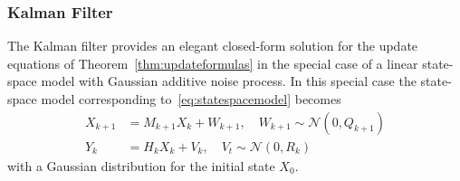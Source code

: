 \subsubsection{Kalman Filter}
The Kalman filter provides an elegant closed-form solution for the update equations of Theorem~\ref{thm:updateformulas} in the special case of a linear state-space model with Gaussian additive noise process.
In this special case the state-space model corresponding to~\eqref{eq:statespacemodel} becomes
\begin{subequations}\label{eq:kalmanstatespace}
    \begin{align}
        X_{k+1} &= M_{k+1}X_{k}  + W_{k+1}, \quad W_{k+1} \sim \mathcal{N}(0, Q_{k+1})\\
        Y_{k} &= H_{k}X_{k} + V_{k}, \quad V_t \sim \mathcal{N}(0, R_k)
    \end{align}
\end{subequations}
with a Gaussian distribution for the initial state $X_0$.

